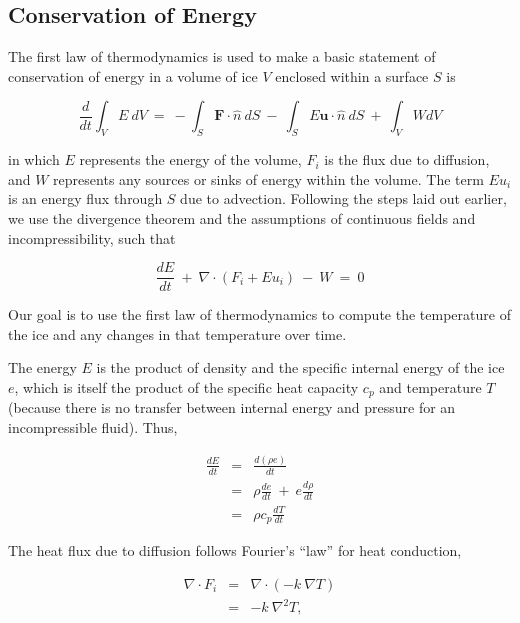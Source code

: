 \subsection{Conservation of Energy}

The first law of thermodynamics is used to make a basic statement of conservation of energy in a volume of ice $V$ enclosed within a surface $S$ is

\begin{equation}
\frac{d}{d t} \int_{V}E ~dV~=~- \int_{S}\mathbf{F}\cdot \hat{n}~dS~-~\int_{S}E \mathbf{u}\cdot \hat{n}~dS~+~\int_{V}W dV
\label{eq:enbal1}
\end{equation}

in which $E$ represents the energy of the volume, $F_{i}$ is the flux due
to diffusion, and $W$ represents any sources or sinks of energy within
the volume. The term $Eu_{i}$ is an energy flux through $S$ due to advection.
Following the steps laid out earlier, we use the divergence theorem and
the assumptions of continuous fields and incompressibility, such that

\begin{equation}
\frac{dE}{dt}~+~\nabla \cdot \left(F_{i} +E u_{i}  \right)~-~W~=~0
\label{eq:enbal2}
\end{equation}

Our goal is to use the first law of thermodynamics to compute the temperature of the ice and any changes in that temperature over time.

The energy $E$ is the product of density and the specific internal
energy of the ice $e$, which is itself the product of the specific heat
capacity $c_{p}$ and temperature $T$ (because there is no transfer
between internal energy and pressure for an incompressible fluid). Thus,

\begin{equation}
\begin{matrix}
\frac{dE}{dt}&=&\frac{d\left(\rho e \right)}{dt} \\
&=&\rho\frac{de}{dt}~+~e \frac{d\rho}{dt}\\
&=&\rho c_{p} \frac{dT}{dt}
\end{matrix}
\label{eq:enbal3}
\end{equation}

The heat flux due to diffusion follows Fourier's ``law'' for heat conduction,

\begin{equation}
\begin{matrix}
\nabla \cdot F_{i}&=&\nabla \cdot \left( -k ~\nabla T  \right) \\
&=&-k~\nabla^{2}T,
\end{matrix}
\label{eq:enbal4}
\end{equation}

